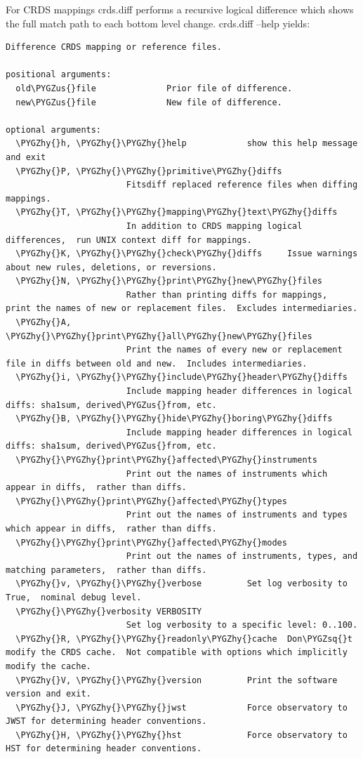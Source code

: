 \documentclass[letterpaper,10pt,english]{sphinxmanual}
\def\PYGZus{\char`\_}
\def\PYGZhy{\char`\-}
\def\PYGZsq{\char`\'}
\begin{document}
For CRDS mappings crds.diff performs a recursive logical difference which shows
the full match path to each bottom level change.   crds.diff --help yields:

\begin{Verbatim}[commandchars=\\\{\}]
Difference CRDS mapping or reference files.

positional arguments:
  old\PYGZus{}file              Prior file of difference.
  new\PYGZus{}file              New file of difference.

optional arguments:
  \PYGZhy{}h, \PYGZhy{}\PYGZhy{}help            show this help message and exit
  \PYGZhy{}P, \PYGZhy{}\PYGZhy{}primitive\PYGZhy{}diffs
                        Fitsdiff replaced reference files when diffing mappings.
  \PYGZhy{}T, \PYGZhy{}\PYGZhy{}mapping\PYGZhy{}text\PYGZhy{}diffs
                        In addition to CRDS mapping logical differences,  run UNIX context diff for mappings.
  \PYGZhy{}K, \PYGZhy{}\PYGZhy{}check\PYGZhy{}diffs     Issue warnings about new rules, deletions, or reversions.
  \PYGZhy{}N, \PYGZhy{}\PYGZhy{}print\PYGZhy{}new\PYGZhy{}files
                        Rather than printing diffs for mappings,  print the names of new or replacement files.  Excludes intermediaries.
  \PYGZhy{}A, \PYGZhy{}\PYGZhy{}print\PYGZhy{}all\PYGZhy{}new\PYGZhy{}files
                        Print the names of every new or replacement file in diffs between old and new.  Includes intermediaries.
  \PYGZhy{}i, \PYGZhy{}\PYGZhy{}include\PYGZhy{}header\PYGZhy{}diffs
                        Include mapping header differences in logical diffs: sha1sum, derived\PYGZus{}from, etc.
  \PYGZhy{}B, \PYGZhy{}\PYGZhy{}hide\PYGZhy{}boring\PYGZhy{}diffs
                        Include mapping header differences in logical diffs: sha1sum, derived\PYGZus{}from, etc.
  \PYGZhy{}\PYGZhy{}print\PYGZhy{}affected\PYGZhy{}instruments
                        Print out the names of instruments which appear in diffs,  rather than diffs.
  \PYGZhy{}\PYGZhy{}print\PYGZhy{}affected\PYGZhy{}types
                        Print out the names of instruments and types which appear in diffs,  rather than diffs.
  \PYGZhy{}\PYGZhy{}print\PYGZhy{}affected\PYGZhy{}modes
                        Print out the names of instruments, types, and matching parameters,  rather than diffs.
  \PYGZhy{}v, \PYGZhy{}\PYGZhy{}verbose         Set log verbosity to True,  nominal debug level.
  \PYGZhy{}\PYGZhy{}verbosity VERBOSITY
                        Set log verbosity to a specific level: 0..100.
  \PYGZhy{}R, \PYGZhy{}\PYGZhy{}readonly\PYGZhy{}cache  Don\PYGZsq{}t modify the CRDS cache.  Not compatible with options which implicitly modify the cache.
  \PYGZhy{}V, \PYGZhy{}\PYGZhy{}version         Print the software version and exit.
  \PYGZhy{}J, \PYGZhy{}\PYGZhy{}jwst            Force observatory to JWST for determining header conventions.
  \PYGZhy{}H, \PYGZhy{}\PYGZhy{}hst             Force observatory to HST for determining header conventions.


\end{Verbatim}
\end{document}
